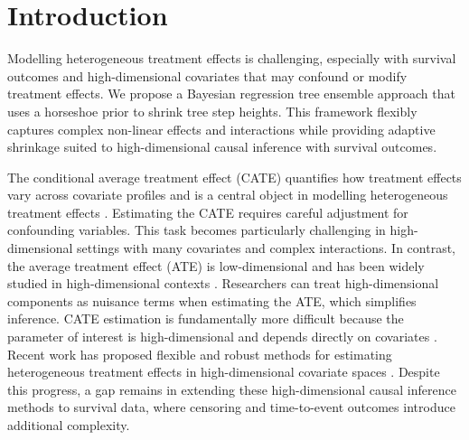 \section{Introduction}

Modelling heterogeneous treatment effects is challenging, especially with survival outcomes and high-dimensional covariates that may confound or modify treatment effects.
We propose a Bayesian regression tree ensemble approach that uses a horseshoe prior to shrink tree step heights.
This framework flexibly captures complex non-linear effects and interactions while providing adaptive shrinkage suited to high-dimensional causal inference with survival outcomes.


The conditional average treatment effect (CATE) quantifies how treatment effects vary across covariate profiles and is a central object in modelling heterogeneous treatment effects \citep{Caron2022CATE}.
Estimating the CATE requires careful adjustment for confounding variables.
This task becomes particularly challenging in high-dimensional settings with many covariates and complex interactions. 
In contrast, the average treatment effect (ATE) is low-dimensional and has been widely studied in high-dimensional contexts \citep{Farrell2015RobustATE, Antonelli2018DRMatching, Antonelli2020Averaging, Ning2020HDPS, Antonelli2022HighDimCausal}.
Researchers can treat high-dimensional components as nuisance terms when estimating the ATE, which simplifies inference.
CATE estimation is fundamentally more difficult because the parameter of interest is high-dimensional and depends directly on covariates \citep{Alaa2018LimitsHTE}.
Recent work has proposed flexible and robust methods for estimating heterogeneous treatment effects in high-dimensional covariate spaces \citep{Powers2018HTE, Fan2020CATE, Shin2023DRInference}.
Despite this progress, a gap remains in extending these high-dimensional causal inference methods to survival data, where censoring and time-to-event outcomes introduce additional complexity.

